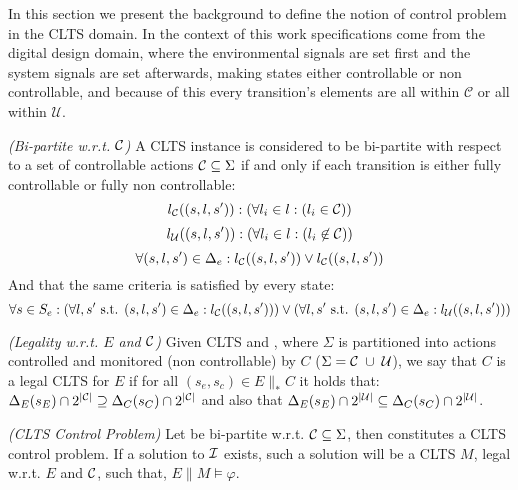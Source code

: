 In this section we present the background to define the notion of control problem in the CLTS domain.  In the context of this work specifications come from the digital design domain, where the environmental signals are set first and the system signals are set afterwards, making states either controllable or non controllable, and because of this every transition's elements are all within $\mathcal{C}$ or all within $\mathcal{U}$. 

\begin{definition}\label{def:bi-partite_clts} \emph{(Bi-partite w.r.t. $\mathcal{C}$)} 
A CLTS instance \cltsDef is considered to be bi-partite with respect to a set of controllable actions $\mathcal{C} \subseteq \Sigma$ if and only if each transition is either fully controllable or fully non controllable:
\[ l_{\mathcal{C}}((s,l,s')): ( \forall l_i \in l:(l_i \in \mathcal{C}))\]
\[ l_{\mathcal{U}}((s,l,s')): ( \forall l_i \in l:(l_i \not\in \mathcal{C}))\]
\[ \forall (s,l,s') \in \Delta_e: l_{\mathcal{C}}((s,l,s')) \vee l_{\mathcal{C}}((s,l,s')) \]
And that the same criteria is satisfied by every state:
\[ \forall s \in S_e : (\forall l, s' \text{ s.t. } (s,l,s') \in \Delta_e:l_{\mathcal{C}}((s,l,s')))\vee (\forall l, s' \text{ s.t. } (s,l,s') \in \Delta_e:l_{\mathcal{U}}((s,l,s')))\]
\end{definition}

\begin{definition}
	\label{def:legal_clts} \emph{(Legality w.r.t. $E$ and $\mathcal{C}$)} 
	Given CLTS  and , where $\Sigma$ is partitioned into actions controlled and monitored (non controllable) by $C$ ($\Sigma=\mathcal{C} \; \cup \;\mathcal{U}$), we say that $C$ is a legal CLTS for $E$ if for all $(s_e,s_c) \in E \parallel_* C$ it holds that:
	$\Delta_{E}(s_E)\cap 2^{|\mathcal{C}|} \supseteq \Delta_{C}(s_C)\cap 2^{|\mathcal{C}|}$ and also that  $\Delta_{E}(s_E)\cap 2^{|\mathcal{U}|} \subseteq \Delta_{C}(s_C)\cap 2^{|\mathcal{U}|}$.
\end{definition}

\begin{definition}
	\label{def:clts_control_problem} \emph{(CLTS Control Problem)} 
	Let  be bi-partite w.r.t. $\mathcal{C} \subseteq \Sigma$, then \controlProblemDef constitutes a CLTS control problem. If a solution to $\mathcal{I}$ exists, such a solution will be a CLTS $M$, legal w.r.t. $E$ and $\mathcal{C}$, such that, $E \parallel M \models \varphi$.
\end{definition}
